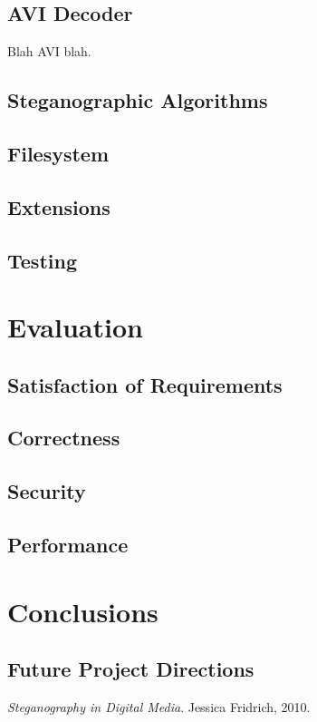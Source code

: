 \documentclass[paper=a4, fontsize=11pt,twoside]{scrartcl}    %
\numberwithin{table}{section}
\numberwithin{figure}{section}
\begin{document}
\subsection{AVI Decoder}

Blah AVI blah.

\vfill
\subsection{Steganographic Algorithms}
\subsection{Filesystem}
\subsection{Extensions}
\subsection{Testing}

\section{Evaluation}
\subsection{Satisfaction of Requirements}
\subsection{Correctness}
\subsection{Security}
\subsection{Performance}

\section{Conclusions}
\subsection{Future Project Directions}


\begin{thebibliography}{1}

  \emph{Steganography in Digital Media}.
  Jessica Fridrich, 2010.

\end{thebibliography}
\end{document}
